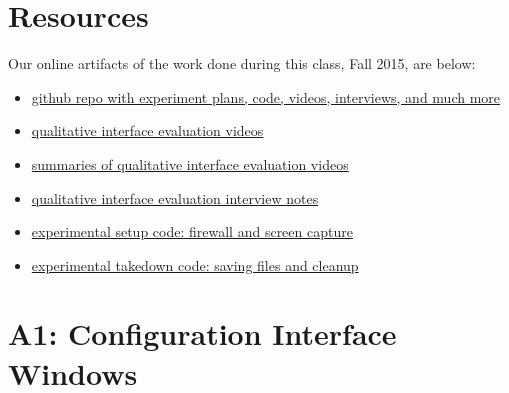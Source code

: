 \documentclass{template}
\begin{document}
\section{Resources}
\noindent Our online artifacts of the work done during this class, Fall 2015,
are below: 
\begin{itemize} \itemsep1pt \parskip0pt 
\item \href{https://github.com/lindanlee/circumvention-ux-tor}{github repo with experiment plans, code, videos, interviews, and much more}
\item \href{https://github.com/lindanlee/circumvention-ux-tor/tree/master/sessions/pre/videos}{qualitative interface evaluation videos}
\item \href{https://github.com/lindanlee/circumvention-ux-tor/blob/master/sessions/pre/participant-summaries.txt}{summaries of qualitative interface evaluation videos}
\item \href{https://github.com/lindanlee/circumvention-ux-tor/tree/master/sessions/pre/notes}{qualitative interface evaluation interview notes}
\item \href{https://github.com/lindanlee/circumvention-ux-tor/blob/master/setup/setup-environment}{experimental setup code: firewall and screen capture} 
\item \href{https://github.com/lindanlee/circumvention-ux-tor/blob/master/setup/takedown-environment}{experimental takedown code: saving files and cleanup} 
\end{itemize}



 

\appendix
\section*{A1: Configuration Interface Windows}
\end{document}
